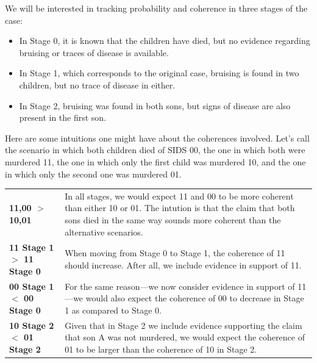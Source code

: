 \documentclass[10pt,]{scrartcl}
\begin{document}
We will be interested in tracking probability and coherence in three stages of the case: 
\begin{itemize} 
\item In \textsf{Stage 0}, it is known that the children have died, but no evidence regarding bruising or traces of disease is available.

\item In \textsf{Stage 1}, which corresponds to the original case, bruising is found in two children, but no trace of disease in either.

\item In \textsf{Stage 2}, bruising was found in both sons, but signs of disease are also present in the first son. 
\end{itemize}












Here  are some intuitions one might have about the coherences involved. Let's call the scenario in which both children died of SIDS 00, the one in which both were murdered 11, the one in which only the first child was murdered 10, and the one in which only the second one was murdered 01.

\begin{tabular}{lp{8cm}}
 \textbf{11,00 $>$10,01} & In all stages, we would expect 11 and 00 to be more coherent than either 10 or 01. The intution is that the claim that both sons died in the same way sounds more coherent than the alternative scenarios.  \\ 
\textbf{11 Stage 1 $>$ 11 Stage 0} & When moving from Stage 0 to Stage 1, the coherence of 11 should increase. After all, we include evidence in support of 11. \\
\textbf{00 Stage 1 $<$ 00 Stage 0} &  For the same reason---we now consider evidence in support of 11---we would also expect the coherence of 00 to decrease in \textsf{Stage 1} as compared to \textsf{Stage 0}. \\
\textbf{10 Stage 2 $<$ 01 Stage 2} &
Given that in Stage 2 we include evidence supporting the claim that son A was not murdered, we would  expect the coherence of 01 to be larger than the coherence of 10 in Stage 2.
\end{tabular}

    
\end{document}
